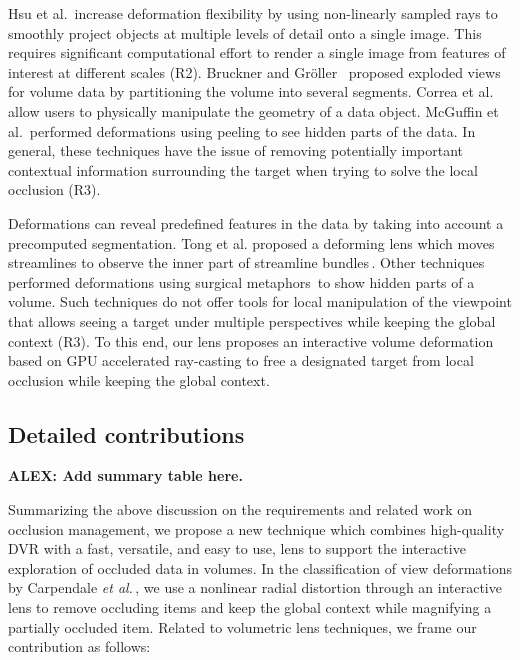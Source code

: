 Hsu et al.\,\cite{Hsu:2011:RFM:2070781.2024165} increase deformation flexibility by using non-linearly sampled rays to smoothly project objects at multiple levels of detail onto a single image. This requires significant computational effort to render a single image from features of interest at different scales (R2). Bruckner and Gr{\"o}ller~\cite{4015467} proposed exploded views for volume data by partitioning the volume into several segments. Correa et al.\,\cite{Correa:2007:IDD:1313046.1313163} allow users to physically manipulate the geometry of a data object. McGuffin et al.\,\cite{1250400} performed deformations using peeling to see hidden parts of the data. In general, these techniques have the issue of removing potentially important contextual information surrounding the target when trying to solve the local occlusion (R3).

Deformations can reveal predefined features in the data by taking into account a precomputed segmentation. Tong et al. proposed a deforming lens which moves streamlines to observe the inner part of streamline bundles\,\cite{7332955}. Other techniques performed deformations using surgical metaphors\,\cite{4069230,Correa:2006:FAV:1187627.1187827} to show hidden parts of a volume. Such techniques do not offer tools for local manipulation of the viewpoint that allows seeing a target under multiple perspectives while keeping the global context (R3). To this end, our lens proposes an interactive volume deformation based on GPU accelerated ray-casting to free a designated target from local occlusion while keeping the global context.

\vspace{-0.09cm}
\subsection{Detailed contributions}
%

\noindent\textbf{ALEX: Add summary table here.}

Summarizing the above discussion on the requirements and related work on occlusion management, we propose a new technique which combines high-quality DVR with a fast, versatile, and easy to use, lens to support the interactive exploration of occluded data in volumes. In the classification of view deformations by Carpendale \emph{et al.}\,\cite{595268}, we use a nonlinear radial distortion through an interactive lens to remove occluding items and keep the global context while magnifying a partially occluded item. Related to volumetric lens techniques, we frame our contribution as follows:
 
